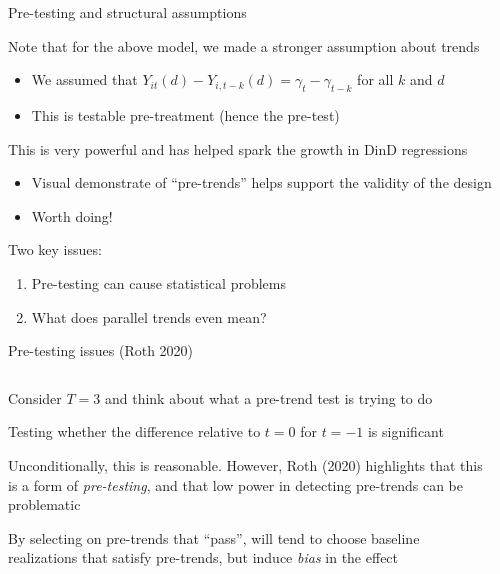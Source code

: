 \documentclass[notes,11pt, aspectratio=169]{beamer}
\newenvironment{wideitemize}{\itemize\addtolength{\itemsep}{10pt}}{\enditemize}
\begin{document}
\begin{frame}{Pre-testing and structural assumptions}
  \begin{wideitemize}
  \item Note that for the above model, we made a stronger assumption about trends
    \begin{itemize}
    \item We assumed that
      $Y_{it}(d) - Y_{i,t-k}(d) = \gamma_{t} - \gamma_{t-k}$ for all
      $k$ and $d$
    \item This is testable pre-treatment (hence the pre-test)
    \end{itemize}
  \item This is very powerful and has helped spark the growth in DinD regressions
    \begin{itemize}
    \item Visual demonstrate of ``pre-trends'' helps support the
      validity of the design
    \item Worth doing!
    \end{itemize}
  \item Two key issues:
    \begin{enumerate}
    \item Pre-testing can cause statistical problems
    \item What does parallel trends even mean?
    \end{enumerate}
  \end{wideitemize}
\end{frame}

\begin{frame}{Pre-testing issues (Roth 2020)}
  \begin{columns}[T] %
    \begin{column}{0.5\textwidth}
      \begin{wideitemize}
      \item Consider $T = 3$ and think about what a pre-trend test is
        trying to do
      \item Testing whether the difference relative to $t= 0$ for $t=-1$ is significant
      \item<3-> Unconditionally, this is reasonable. However, Roth
        (2020) highlights that this is a form of \emph{pre-testing},
        and that low power in detecting pre-trends can be problematic
      \item<5-> By selecting on pre-trends that ``pass'', will tend to
        choose baseline realizations that satisfy pre-trends, but
        induce \emph{bias} in the effect
      \end{wideitemize}
    \end{column}%
    \hfill%
    \begin{column}{.5\textwidth}
    \end{column}
  \end{columns}
\end{frame}
\end{document}

